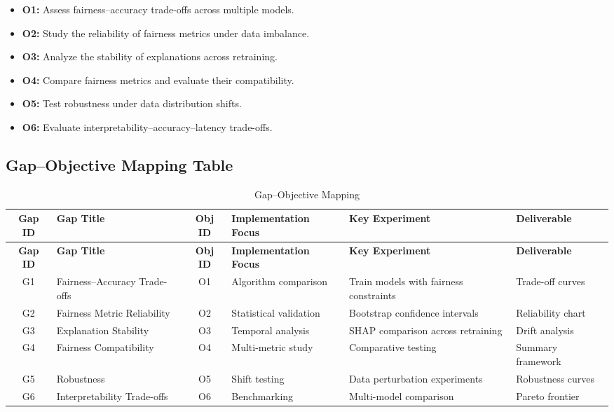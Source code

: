 \begin{itemize}
    \item \textbf{O1:} Assess fairness--accuracy trade-offs across multiple models.
    \item \textbf{O2:} Study the reliability of fairness metrics under data imbalance.
    \item \textbf{O3:} Analyze the stability of explanations across retraining.
    \item \textbf{O4:} Compare fairness metrics and evaluate their compatibility.
    \item \textbf{O5:} Test robustness under data distribution shifts.
    \item \textbf{O6:} Evaluate interpretability--accuracy--latency trade-offs.
\end{itemize}

\subsection*{Gap--Objective Mapping Table}

\begin{longtable}{c p{} c p{} p{} p{}}
\caption{Gap--Objective Mapping} \\
\toprule
\textbf{Gap ID} & \textbf{Gap Title} & \textbf{Obj ID} & \textbf{Implementation Focus} & \textbf{Key Experiment} & \textbf{Deliverable} \\
\midrule
\endfirsthead
\toprule
\textbf{Gap ID} & \textbf{Gap Title} & \textbf{Obj ID} & \textbf{Implementation Focus} & \textbf{Key Experiment} & \textbf{Deliverable} \\
\midrule
\endhead

G1 & Fairness--Accuracy Trade-offs & O1 & Algorithm comparison & Train models with fairness constraints & Trade-off curves \\
G2 & Fairness Metric Reliability & O2 & Statistical validation & Bootstrap confidence intervals & Reliability chart \\
G3 & Explanation Stability & O3 & Temporal analysis & SHAP comparison across retraining & Drift analysis \\
G4 & Fairness Compatibility & O4 & Multi-metric study & Comparative testing & Summary framework \\
G5 & Robustness & O5 & Shift testing & Data perturbation experiments & Robustness curves \\
G6 & Interpretability Trade-offs & O6 & Benchmarking & Multi-model comparison & Pareto frontier \\

\bottomrule
\end{longtable}